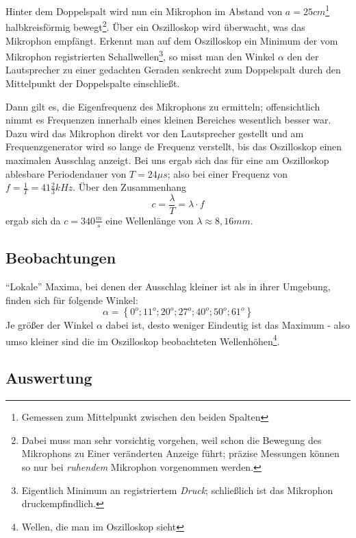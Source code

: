Hinter dem Doppelspalt wird nun ein Mikrophon im Abstand von \(a = 25cm\)\footnote{Gemessen zum Mittelpunkt zwischen den beiden Spalten} halbkreisförmig bewegt\footnote{Dabei muss man sehr vorsichtig vorgehen, weil schon die Bewegung des Mikrophons zu Einer veränderten Anzeige führt; präzise Messungen können so nur bei \emph{ruhendem} Mikrophon vorgenommen werden.}. Über ein Oszilloskop wird überwacht, was das Mikrophon empfängt. Erkennt man auf dem Oszilloskop ein Minimum der vom Mikrophon registrierten Schallwellen\footnote{Eigentlich Minimum an registriertem \emph{Druck}; schließlich ist das Mikrophon druckempfindlich.}, so misst man den Winkel \(\alpha\) den der Lautsprecher zu einer gedachten Geraden senkrecht zum Doppelspalt durch den Mittelpunkt der Doppelspalte einschließt.

Dann gilt es, die Eigenfrequenz des Mikrophons zu ermitteln; offensichtlich nimmt es Frequenzen innerhalb eines kleinen Bereiches wesentlich besser war. Dazu wird das Mikrophon direkt vor den Lautsprecher gestellt und am Frequenzgenerator wird so lange de Frequenz verstellt, bis das Oszilloskop einen maximalen Ausschlag anzeigt. Bei uns ergab sich das für eine am Oszilloskop ablesbare Periodendauer von \(T = 24\mu s\); also bei einer Frequenz von \(f = \frac{1}{T} = 41 \frac{2}{3} kHz\). Über den Zusammenhang
\begin{equation}
   c = \frac{\lambda}{T} = \lambda \cdot f
   \label{eq_c=lf_p}
\end{equation}
ergab sich da \(c = 340 \frac{m}{s}\) eine Wellenlänge von \(\lambda \approx 8,16mm\).






\subsection{Beobachtungen}


``Lokale'' Maxima, bei denen der Ausschlag kleiner ist als in ihrer Umgebung, finden sich für folgende Winkel: 
\[ \alpha = \left \{   0^o; 11^o; 20^o; 27^o; 40^o; 50^o; 61^o  \right \} \]
Je größer der Winkel \(\alpha\) dabei ist, desto weniger Eindeutig ist das Maximum - also umso kleiner sind die im Oszilloskop beobachteten Wellenhöhen\footnote{Wellen, die man im Oszilloskop sieht}.


\subsection{Auswertung}


